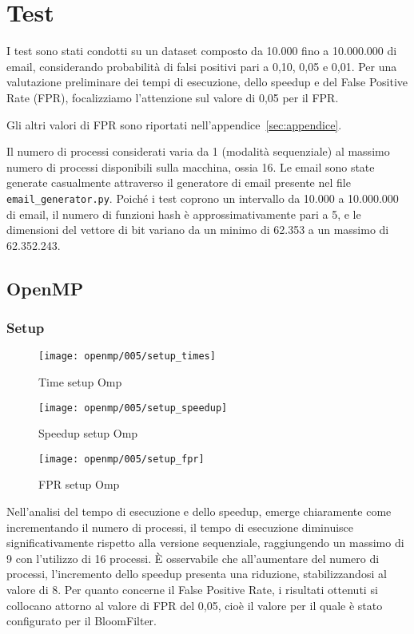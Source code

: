 \section{Test}\label{sec:test}
I test sono stati condotti su un dataset composto da 10.000 fino a 10.000.000 di email, considerando probabilità di
falsi positivi pari a 0,10, 0,05 e 0,01.
Per una valutazione preliminare dei tempi di esecuzione, dello speedup e del False Positive Rate (FPR),
focalizziamo l'attenzione sul valore di 0,05 per il FPR\@.

Gli altri valori di FPR sono riportati nell'appendice~\ref{sec:appendice}.

Il numero di processi considerati varia da 1 (modalità sequenziale) al massimo numero di processi disponibili sulla
macchina, ossia 16.
Le email sono state generate casualmente attraverso il generatore di email presente nel file \texttt{email\_generator.py}.
Poiché i test coprono un intervallo da 10.000 a 10.000.000 di email, il numero di funzioni hash è approssimativamente
pari a 5, e le dimensioni del vettore di bit variano da un minimo di 62.353 a un massimo di 62.352.243.

\subsection{OpenMP}\label{subsec:openmp-test}
\subsubsection{Setup}\label{subsubsec:openmp-setup}
\begin{figure}[H]
    \centering
    \texttt{[image: openmp/005/setup\_times]}
        \caption{Time setup Omp}\label{fig:005-setup_time_omp}
    \endminipage\hfill
    \texttt{[image: openmp/005/setup\_speedup]}
        \caption{Speedup setup Omp}\label{fig:005-setup_speedup_omp}
    \endminipage\hfill
\end{figure}
\begin{figure}[H]
    \centering
    \texttt{[image: openmp/005/setup\_fpr]}
        \caption{FPR setup Omp}\label{fig:005-setup_fpr_omp}
    \endminipage\hfill
\end{figure}

Nell'analisi del tempo di esecuzione e dello speedup, emerge chiaramente come incrementando il numero di processi,
il tempo di esecuzione diminuisce significativamente rispetto alla versione sequenziale, raggiungendo un massimo di 9
con l'utilizzo di 16 processi.
È osservabile che all'aumentare del numero di processi, l'incremento dello speedup presenta una riduzione,
stabilizzandosi al valore di 8.
Per quanto concerne il False Positive Rate, i risultati ottenuti si collocano attorno al valore di FPR del 0,05, cioè
il valore per il quale è stato configurato per il BloomFilter.

